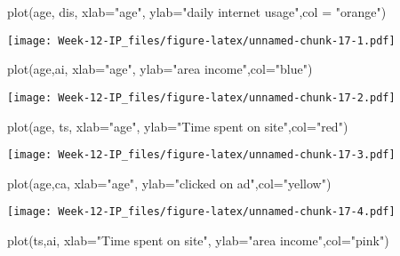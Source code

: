 \documentclass[
]{article}
\newenvironment{Shaded}{\begin{snugshade}}{\end{snugshade}}
\newcommand{\AttributeTok}[1]{\textcolor[rgb]{0.77,0.63,0.00}{#1}}
\newcommand{\FunctionTok}[1]{\textcolor[rgb]{0.00,0.00,0.00}{#1}}
\newcommand{\NormalTok}[1]{#1}
\newcommand{\StringTok}[1]{\textcolor[rgb]{0.31,0.60,0.02}{#1}}
\begin{document}
\begin{Shaded}
\begin{Highlighting}[]
\FunctionTok{plot}\NormalTok{(age, dis, }\AttributeTok{xlab=}\StringTok{"age"}\NormalTok{, }\AttributeTok{ylab=}\StringTok{"daily internet usage"}\NormalTok{,}\AttributeTok{col =} \StringTok{"orange"}\NormalTok{)}
\end{Highlighting}
\end{Shaded}

\texttt{[image: Week-12-IP\_files/figure-latex/unnamed-chunk-17-1.pdf]}

\begin{Shaded}
\begin{Highlighting}[]
\FunctionTok{plot}\NormalTok{(age,ai, }\AttributeTok{xlab=}\StringTok{"age"}\NormalTok{, }\AttributeTok{ylab=}\StringTok{"area income"}\NormalTok{,}\AttributeTok{col=}\StringTok{"blue"}\NormalTok{)}
\end{Highlighting}
\end{Shaded}

\texttt{[image: Week-12-IP\_files/figure-latex/unnamed-chunk-17-2.pdf]}

\begin{Shaded}
\begin{Highlighting}[]
\FunctionTok{plot}\NormalTok{(age, ts, }\AttributeTok{xlab=}\StringTok{"age"}\NormalTok{, }\AttributeTok{ylab=}\StringTok{"Time spent on site"}\NormalTok{,}\AttributeTok{col=}\StringTok{"red"}\NormalTok{)}
\end{Highlighting}
\end{Shaded}

\texttt{[image: Week-12-IP\_files/figure-latex/unnamed-chunk-17-3.pdf]}

\begin{Shaded}
\begin{Highlighting}[]
\FunctionTok{plot}\NormalTok{(age,ca, }\AttributeTok{xlab=}\StringTok{"age"}\NormalTok{, }\AttributeTok{ylab=}\StringTok{"clicked on ad"}\NormalTok{,}\AttributeTok{col=}\StringTok{"yellow"}\NormalTok{)}
\end{Highlighting}
\end{Shaded}

\texttt{[image: Week-12-IP\_files/figure-latex/unnamed-chunk-17-4.pdf]}

\begin{Shaded}
\begin{Highlighting}[]
\FunctionTok{plot}\NormalTok{(ts,ai, }\AttributeTok{xlab=}\StringTok{"Time spent on site"}\NormalTok{, }\AttributeTok{ylab=}\StringTok{"area income"}\NormalTok{,}\AttributeTok{col=}\StringTok{"pink"}\NormalTok{)}
\end{Highlighting}
\end{Shaded}
\end{document}
